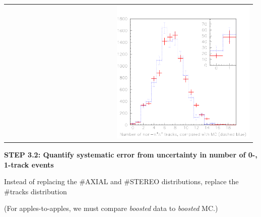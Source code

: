\documentclass[landscape]{article}
\begin{document}
\begin{tabular}{p{0.4\linewidth} p{0.03\linewidth} p{0.55\linewidth}}
\begin{minipage}{\linewidth}
  \end{minipage} & &
  \begin{minipage}{\linewidth} \includegraphics[width=\linewidth]{cascades_tracks_boost3_tt.pdf} \end{minipage}
\end{tabular}

\vfill

\pagebreak

\vspace{1 cm}

{\bf STEP 3.2: Quantify systematic error from uncertainty in number of
0-, 1-track events}

\vfill

Instead of replacing the \#AXIAL and \#STEREO distributions, replace the
\#tracks distribution

\vfill

(For apples-to-apples, we must compare {\it boosted} data to {\it boosted} MC.)

\vfill
\end{document}

